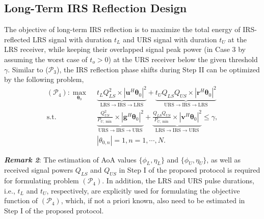 \documentclass[10pt,final,doublecolumn]{IEEEtran}
\begin{document}
\subsection{Long-Term IRS Reflection Design}
The objective of long-term IRS reflection is to maximize the total energy of IRS-reflected LRS signal with duration $t_L$ and URS signal with duration $t_U$ at the LRS receiver, while keeping their overlapped signal peak power (in Case 3 by assuming the worst case of $t_o>0$) at the URS receiver below the given threshold $\gamma$. Similar to ($\mathcal{P}_3$), the IRS reflection phase shifts during Step II can be optimized by the following problem,
\begin{subequations}
\label{31}
\begin{align}
(\mathcal{P}_4): \mathop{\max}\limits_{\boldsymbol{\theta}_0}~&~
\underbrace{t_L{{Q_{LS}^2}\times|{\mathbf{u}}^H
\boldsymbol{\theta}_0|^2}}_{\text{LRS}\rightarrow \text{IRS}\rightarrow \text{LRS}}+\underbrace{t_U{{Q_{LS}Q_{US}}\times|{\mathbf{r}}^H
\boldsymbol{\theta}_0|^2}}_{\text{URS}\rightarrow \text{IRS}\rightarrow \text{LRS}}
\label{pqw}\\
\text {s.t.}~&~\underbrace{{\frac{Q_{US}^2}{P_{U,\min}}\times|{\mathbf{g}}^H
\boldsymbol{\theta}_0|^2}}_{\text{URS}\rightarrow \text{IRS}\rightarrow \text{URS}}+\underbrace{{\frac{Q_{LS}Q_{US}}{P_{U,\min}}\times|{\mathbf{v}}^H
\boldsymbol{\theta}_0|^2}}_{\text{LRS}\rightarrow \text{IRS}\rightarrow \text{URS}}\leq \gamma,\label{pqw1}\\
~&~|{\theta}_{0,n}|= 1, n=1,\cdots,N. \label{pqw2}
\end{align}
\end{subequations}

{\bf{\emph{Remark 2}}}: The estimation of AoA values $\{\phi_L, \eta_L\}$ and $\{\phi_U, \eta_U\}$, as well as received signal powers $Q_{LS}$ and $Q_{US}$ in Step I of the proposed protocol is required for formulating problem $(\mathcal{P}_4)$. In addition, the LRS and URS pulse durations, i.e., $t_L$ and $t_U$, respectively, are explicitly used for formulating the objective function of $(\mathcal{P}_4)$, which, if not a priori known, also need to be estimated in Step I of the proposed protocol.
\end{document}
